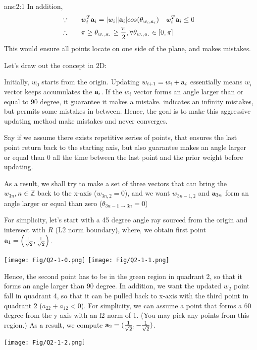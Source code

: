 \documentclass{tron}
\begin{document}
\begin{answer}{ans:2:1}
	In addition, 
	\begin{align}
		\because \qquad & w_i^T \mathbf{a}_i = |w_i||\mathbf{a}_i| cos(\theta_{w_i,a_i}) \quad w_i^T\mathbf{a}_i \leq 0\\
		\therefore \qquad & \pi \geq \theta_{w_i,a_i} \geq \frac{\pi}{2}, \forall \theta_{w_i,a_i} \in [0, \pi]
	\end{align}
	This would ensure all points locate on one side of the plane, and makes mistakes.
	
	Let's draw out the concept in 2D:

	Initially, $w_0$ starts from the origin. Updating $w_{i+1} = w_i + \mathbf{a}_i$ essentially means $w_i$ vector keeps accumulates the $\mathbf{a}_i$. If the $w_i$ vector forms an angle larger than or equal to 90 degree, it guarantee it makes a mistake.  indicates an infinity mistakes, but permits some mistakes in between. Hence, the goal is to make this aggressive updating method make mistakes and never converges. 
	
	Say if we assume there exists repetitive series of points, that ensures the last point return back to the starting axis, but also guarantee makes an angle larger or equal than 0 all the time between the last point and the prior weight before updating. 
	
	As a result, we shall try to make a set of three vectors that can bring the ${w_{3n}, n\in \mathbb{Z}}$ back to the x-axis ($w_{3n, 2} = 0$), and we want $w_{3n-1, 2}$ and $\mathbf{a}_{3n}$ form an angle larger or equal than zero ($\theta_{3n-1 \rightarrow 3n} = 0$)
	
	For simplicity, let's start with a 45 degree angle ray sourced from the origin and intersect with $R$ (L2 norm boundary), where, we obtain first point $\mathbf{a}_1 = \left(\frac{1}{\sqrt{2}}, \frac{1}{\sqrt{2}}\right)$.
	
	\texttt{[image: Fig/Q2-1-0.png]}\quad
	\texttt{[image: Fig/Q2-1-1.png]}

	Hence, the second point has to be in the green region in quadrant 2, so that it forms an angle larger than 90 degree. In addition, we want the updated $w_2$ point fall in quadrant 4, so that it can be pulled back to x-axis with the third point in quadrant 2 ($a_{22} + a_{12} < 0$). For simplicity, we can assume a point that forms a 60 degree from the y axis with an l2 norm of 1. (You may pick any points from this region.) As a result, we compute $\mathbf{a}_2 = (\frac{1}{\sqrt{2}}, -\frac{1}{\sqrt{2}})$.

	\texttt{[image: Fig/Q2-1-2.png]}
	

\end{answer}
\end{document}
